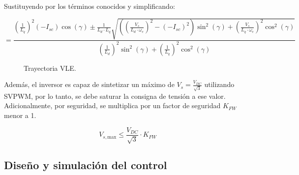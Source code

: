 Sustituyendo por los términos conocidos y simplificando:

\begin{equation}
	=\frac{\left(\frac{1}{L_q}\right)^2\left(-I_{s c}\right) \cos (\gamma) \pm \frac{1}{L_d \cdot L_q} \sqrt{\left(\left(\frac{V_s}{L_d \cdot \omega_e}\right)^2-\left(-I_{s c}\right)^2\right) \sin ^2(\gamma)+\left(\frac{V_s}{L_q \cdot \omega_e}\right)^2 \cos ^2(\gamma)}}{\left(\frac{1}{L_d}\right)^2 \sin ^2(\gamma)+\left(\frac{1}{L_q}\right)^2 \cos ^2(\gamma)}
\end{equation}


\begin{figure}[H]
  \centering
  \caption{Trayectoria VLE.}
\end{figure}



Además, el inversor es capaz de sintetizar un máximo de $V_s = \frac{V_{DC}}{\sqrt{3}}$ utilizando SVPWM, por lo tanto, se debe saturar la consigna de tensión a ese valor. Adicionalmente, por seguridad, se multiplica por un factor de seguridad $K_{FW}$ menor a 1.

\begin{equation}
	V_{s,\text{max}} \leq \frac{V_{DC}}{\sqrt{3}}\cdot K_{FW}
\end{equation}

\subsection{Diseño y simulación del control}


